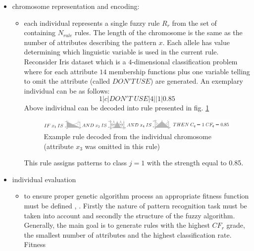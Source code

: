 \begin{itemize}
    \item chromosome representation and encoding: 
        \begin{itemize}
            \item each individual represents a single fuzzy rule $R_r$ from the
                set of containing $N_{rule}$ rules.
                The length of the chromosome is the same as the number of 
                attributes describing the pattern $x$. Each allele has value
                determining which linguistic variable is used in the current
                rule. Reconsider Iris dataset which is a $4$-dimensional
                classification problem where for each attribute $14$
                membership functions plus one variable telling to omit the
                attribute (called $DON'T \,USE$) are generated. 
                An exemplary individual can be as follows:
                $$1|c|DON'T \;USE|4||1|0.85$$
                Above individual can be decoded into rule presented in fig.
                \ref{fig:fuzzy_rule}
                \begin{figure}[H]
                    \begin{center}
                        \includegraphics[width=\textwidth]{fig/fuzzy_rule.png}
                    \end{center}
                    \caption{Example rule decoded from the individual
                    chromosome (attribute $x_3$ was omitted in this rule)}
                    \label{fig:fuzzy_rule}
                \end{figure}  
                This rule assigns patterns to class $j=1$ with the strength equal to 0.85.
        \end{itemize}
    \item individual evaluation
        \begin{itemize}
            \item to ensure proper genetic algorithm process an appropriate
                fitness function must be defined \cite{bib10}, \cite{bib21}. 
                Firstly the nature of pattern recognition task must be taken 
                into account and secondly the structure of the fuzzy algorithm. 
                Generally, the main goal is
                to generate rules with the highest $CF_r$ grade, the smallest number
                of attributes and the highest classification rate. Fitness

\end{itemize}
\end{itemize}
